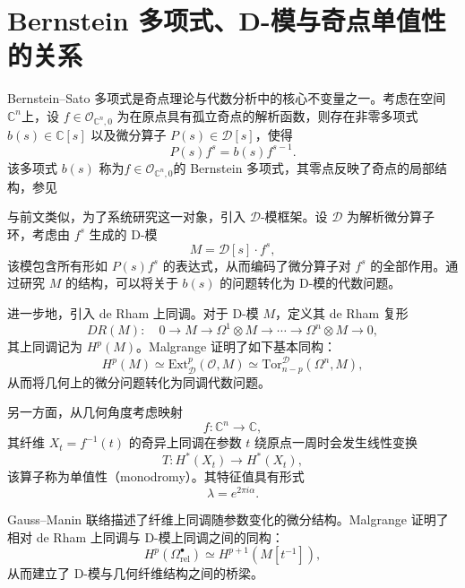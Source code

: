\documentclass[12pt,a4paper]{ctexrep}   %
\begin{document}
\section{Bernstein 多项式、D-模与奇点单值性的关系}
Bernstein--Sato 多项式是奇点理论与代数分析中的核心不变量之一。考虑在空间$\mathbb{C}^n$上，设 $f \in \mathcal{O}_{\mathbb{C}^n,0}$ 为在原点具有孤立奇点的解析函数，则存在非零多项式 $b(s) \in \mathbb{C}[s]$ 以及微分算子 $P(s) \in \mathcal{D}[s]$，使得
\begin{equation*}
    P(s) f^s = b(s) f^{s-1}.
\end{equation*}
该多项式 $b(s)$ 称为$f \in \mathcal{O}_{\mathbb{C}^n,0}$的 Bernstein 多项式，其零点反映了奇点的局部结构，参见\cite{malgrange2006polynome}

与前文类似，为了系统研究这一对象，引入 $\mathcal{D}$-模框架。设 $\mathcal{D}$ 为解析微分算子环，考虑由 $f^s$ 生成的 D-模
\begin{equation*}
    M = \mathcal{D}[s]\cdot f^s,
\end{equation*}
该模包含所有形如 $P(s)f^s$ 的表达式，从而编码了微分算子对 $f^s$ 的全部作用。通过研究 $M$ 的结构，可以将关于 $b(s)$ 的问题转化为 D-模的代数问题。

进一步地，引入 de Rham 上同调。对于 D-模 $M$，定义其 de Rham 复形
\begin{equation*}
    DR(M): \quad 0 \to M \to \Omega^1 \otimes M \to \cdots \to \Omega^n \otimes M \to 0,
\end{equation*}
其上同调记为 $H^p(M)$。Malgrange 证明了如下基本同构：
\begin{equation*}
    H^p(M) \simeq \mathrm{Ext}^p_{\mathcal{D}}(\mathcal{O}, M) \simeq \mathrm{Tor}_{n-p}^{\mathcal{D}}(\Omega^n, M),
\end{equation*}
从而将几何上的微分问题转化为同调代数问题。


另一方面，从几何角度考虑映射
\[
    f: \mathbb{C}^n \to \mathbb{C},
\]
其纤维 $X_t = f^{-1}(t)$ 的奇异上同调在参数 $t$ 绕原点一周时会发生线性变换
\begin{equation*}
    T: H^{*}(X_t) \to H^{*}(X_t),
\end{equation*}
该算子称为单值性（monodromy）。其特征值具有形式
\begin{equation*}
    \lambda = e^{2\pi i \alpha}.
\end{equation*}





Gauss--Manin 联络描述了纤维上同调随参数变化的微分结构。Malgrange 证明了相对 de Rham 上同调与 D-模上同调之间的同构：
\begin{equation*}
    H^p(\Omega^\bullet_{\mathrm{rel}}) \simeq H^{p+1}(M[t^{-1}]),
\end{equation*}
从而建立了 D-模与几何纤维结构之间的桥梁。
\end{document}
